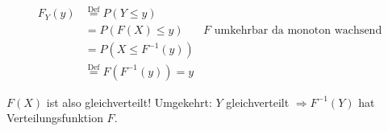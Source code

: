\documentclass[10pt,a4paper]{scrartcl}
\begin{document}
\begin{align*}
  F_Y(y) & \stackrel{\text{Def}}{=} P(Y \le y) \\
         & = P(F(X) \le y)  & F \text{ umkehrbar da monoton wachsend} \\
         & = P(X \le F^{-1}(y)) \\
         & \stackrel{\text{Def}}{=} F(F^{-1}(y)) = y 
\end{align*}

$F(X)$ ist also gleichverteilt!
Umgekehrt: $Y$ gleichverteilt $\Rightarrow F^{-1}(Y)$ hat Verteilungsfunktion $F$.
\end{document}
